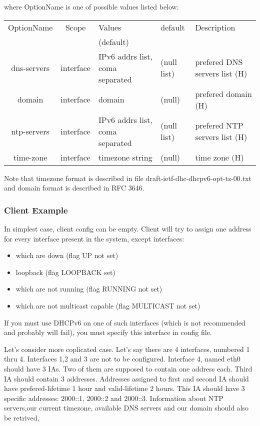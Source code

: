 where OptionName is one of possible values listed below:

\begin{tabular}{|c|c|p{2.5cm}|p{3cm}|p{6cm}|}
\hline
OptionName     & Scope & Values    & default & Description \\
               &       & (default) &         & \\
\hline
dns-servers    & interface& IPv6 addrs list, coma separated & (null list) & prefered DNS servers list (H) \\
domain         & interface& domain & (null) & prefered domain (H)\\
ntp-servers    & interface& IPv6 addrs list, coma separated & (null list) & prefered NTP servers list (H)\\
time-zone      & interface& timezone string & (null) & time zone (H)\\

\hline
\end{tabular}

Note that timezone format is described in file draft-ietf-dhc-dhcpv6-opt-tz-00.txt 
and domain format is described in RFC 3646.

\subsubsection{Client Example}

In simplest case, client config can be empty. Client will try to
assign one address for every interface present in the system, except
interfaces:
\begin{itemize}
\item which are down (flag UP not set)
\item loopback (flag LOOPBACK set)
\item which are not running (flag RUNNING not set)
\item which are not multicast capable (flag MULTICAST not set)
\end{itemize}

If you must use DHCPv6 on one of such interfaces (which is not
recommended and probably will fail), you must specify this interface
in config file.

Let's consider more coplicated case. Let's say there are 4 interfaces,
numbered 1 thru 4. Interfaces 1,2 and 3 are not to be
configured. Interface 4, named eth0 should have 3 IAs. Two of them are
supposed to contain one address each. Third IA should contain 3
addresses. Addresses assigned to first and second IA should have
prefered-lifetime 1 hour and valid-lifetime 2 hours. This IA should
have 3 specific addresses: 2000::1, 2000::2 and 2000::3. Information
about NTP servers,our current timezone, available DNS servers and our
domain should also be retrived,

